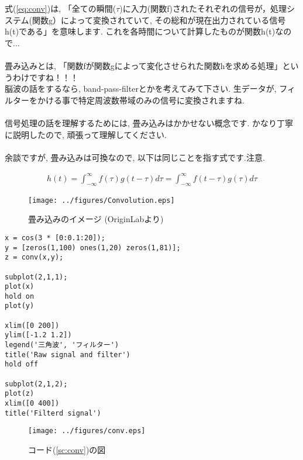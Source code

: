 \documentclass[11pt,a4paper]{ujreport}
\begin{document}
式(\ref{eq:conv})は, 「全ての瞬間($\tau$)に入力(関数f)されたそれぞれの信号が，処理システム(関数g）によって変換されていて, その総和が現在出力されている信号h(t)である」を意味します. これを各時間について計算したものが関数h(t)なので...\\
\\
畳み込みとは, 「関数fが関数gによって変化させられた関数hを求める処理」というわけですね！！！\\
脳波の話をするなら, band-pass-filterとかを考えてみて下さい. 生データが, フィルターをかける事で特定周波数帯域のみの信号に変換されますね. \\
\\
信号処理の話を理解するためには, 畳み込みはかかせない概念です. かなり丁寧に説明したので, 頑張って理解してください.\\
\\
余談ですが, 畳み込みは可換なので, 以下は同じことを指す式です.注意.

\begin{eqnarray}
h(t) = \int^{\infty}_{-\infty} f(\tau) g(t - \tau) d\tau=
 \int^{\infty}_{-\infty} f(t-\tau) g(\tau) d\tau
\end{eqnarray}

\begin{figure}[H]
\label{im:convolution}
  \centering
  \texttt{[image: ../figures/Convolution.eps]}
  \caption{畳み込みのイメージ (OriginLabより)}
\end{figure}

\begin{lstlisting}[caption=畳み込みのコード,label=sc:conv]
x = cos(3 * [0:0.1:20]);
y = [zeros(1,100) ones(1,20) zeros(1,81)];
z = conv(x,y);

subplot(2,1,1);
plot(x)
hold on
plot(y)

xlim([0 200])
ylim([-1.2 1.2])
legend('三角波', 'フィルター')
title('Raw signal and filter')
hold off

subplot(2,1,2); 
plot(z)
xlim([0 400])
title('Filterd signal')
\end{lstlisting}

\begin{figure}[H]
\label{im:conv2}
  \centering
  \texttt{[image: ../figures/conv.eps]}
  \caption{コード(\ref{sc:conv})の図}
\end{figure}
\end{document}
